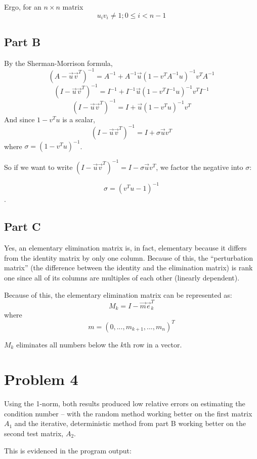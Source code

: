 \documentclass[paper=a4, fontsize=11pt]{scrartcl} %
\numberwithin{equation}{section} %
\numberwithin{figure}{section} %
\numberwithin{table}{section} %
\begin{document}
Ergo, for an $n \times n$ matrix
$$
	u_iv_i \neq 1; 0 \leq i < n - 1
$$

\subsection*{Part B}
By the Sherman-Morrison formula, 
$$(A - \vec{u}\vec{v}^T)^{-1} = A^{-1} + A^{-1}\vec{u}(1  - v^TA^{-1}u)^{-1}v^TA^{-1}$$
$$(I - \vec{u}\vec{v}^T)^{-1} = I^{-1} + I^{-1}\vec{u}(1  - v^TI^{-1}u)^{-1}v^TI^{-1}$$
$$(I - \vec{u}\vec{v}^T)^{-1} = I + \vec{u}(1  - v^Tu)^{-1}v^T$$
And since $1 - v^Tu$ is a scalar,
$$(I - \vec{u}\vec{v}^T)^{-1} = I + \sigma\vec{u}v^T$$
where $\sigma = (1  - v^Tu)^{-1}$.

So if we want to write $(I - \vec{u}\vec{v}^T)^{-1} = I - \sigma\vec{u}v^T$, we factor the negative into $\sigma$:

$$
\sigma = (v^Tu - 1)^{-1}
$$.

\subsection*{Part C}
Yes, an elementary elimination matrix is, in fact, elementary because it differs from the identity matrix by only one column. Because of this, the ``perturbation matrix'' (the difference between the identity and the elimination matrix) is rank one since all of its columns are multiples of each other (linearly dependent).

Because of this, the elementary elimination matrix can be represented as:
$$
	M_k = I - \vec{m}\vec{e}_k^T 
$$
where 
$$
m = (0, ..., m_{k+1}, ..., m_n)^T
$$

$M_k$ eliminates all numbers below the $k$th row in a vector.


\section*{Problem 4}
Using the 1-norm, both results produced low relative errors on estimating the condition number -- with the random method working better on the first matrix $A_1$ and the iterative, deterministic method from part B working better on the second test matrix, $A_2$.

This is evidenced in the program output:
\end{document}
